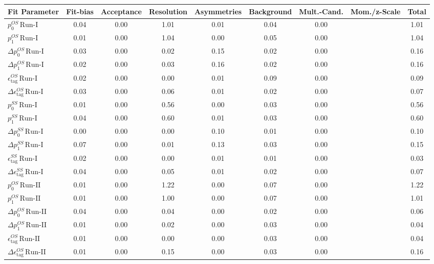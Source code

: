 \begin{tabular}{l  c  c  c  c  c  c  c  | c }
\hline
\hline
Fit Parameter & Fit-bias & Acceptance & Resolution & Asymmetries & Background & Mult.-Cand. & Mom./z-Scale &  Total  \\ 
\hline
$p_{0}^{OS} \, \text{Run-I}$ & 0.04 & 0.00 & 1.01 & 0.01 & 0.04 & 0.00 &  & 1.01 \\ 
$p_{1}^{OS} \, \text{Run-I}$ & 0.01 & 0.00 & 1.04 & 0.00 & 0.05 & 0.00 &  & 1.04 \\ 
$\Delta p_{0}^{OS} \, \text{Run-I}$ & 0.03 & 0.00 & 0.02 & 0.15 & 0.02 & 0.00 &  & 0.16 \\ 
$\Delta p_{1}^{OS} \, \text{Run-I}$ & 0.02 & 0.00 & 0.03 & 0.16 & 0.02 & 0.00 &  & 0.16 \\ 
$\epsilon_{\text{tag}}^{OS} \, \text{Run-I}$ & 0.02 & 0.00 & 0.00 & 0.01 & 0.09 & 0.00 &  & 0.09 \\ 
$\Delta \epsilon_{\text{tag}}^{OS} \, \text{Run-I}$ & 0.03 & 0.00 & 0.06 & 0.01 & 0.02 & 0.00 &  & 0.07 \\ 
$p_{0}^{SS} \, \text{Run-I}$ & 0.01 & 0.00 & 0.56 & 0.00 & 0.03 & 0.00 &  & 0.56 \\ 
$p_{1}^{SS} \, \text{Run-I}$ & 0.04 & 0.00 & 0.60 & 0.01 & 0.03 & 0.00 &  & 0.60 \\ 
$\Delta p_{0}^{SS} \, \text{Run-I}$ & 0.00 & 0.00 & 0.00 & 0.10 & 0.01 & 0.00 &  & 0.10 \\ 
$\Delta p_{1}^{SS} \, \text{Run-I}$ & 0.07 & 0.00 & 0.01 & 0.13 & 0.03 & 0.00 &  & 0.15 \\ 
$\epsilon_{\text{tag}}^{SS} \, \text{Run-I}$ & 0.02 & 0.00 & 0.00 & 0.01 & 0.01 & 0.00 &  & 0.03 \\ 
$\Delta \epsilon_{\text{tag}}^{SS} \, \text{Run-I}$ & 0.04 & 0.00 & 0.05 & 0.01 & 0.02 & 0.00 &  & 0.07 \\ 
$p_{0}^{OS} \, \text{Run-II}$ & 0.01 & 0.00 & 1.22 & 0.00 & 0.07 & 0.00 &  & 1.22 \\ 
$p_{1}^{OS} \, \text{Run-II}$ & 0.01 & 0.00 & 1.00 & 0.00 & 0.07 & 0.00 &  & 1.01 \\ 
$\Delta p_{0}^{OS} \, \text{Run-II}$ & 0.04 & 0.00 & 0.04 & 0.00 & 0.02 & 0.00 &  & 0.06 \\ 
$\Delta p_{1}^{OS} \, \text{Run-II}$ & 0.01 & 0.00 & 0.02 & 0.00 & 0.03 & 0.00 &  & 0.04 \\ 
$\epsilon_{\text{tag}}^{OS} \, \text{Run-II}$ & 0.01 & 0.00 & 0.00 & 0.00 & 0.03 & 0.00 &  & 0.04 \\ 
$\Delta \epsilon_{\text{tag}}^{OS} \, \text{Run-II}$ & 0.01 & 0.00 & 0.15 & 0.00 & 0.03 & 0.00 &  & 0.16 \\ 

\end{tabular}
